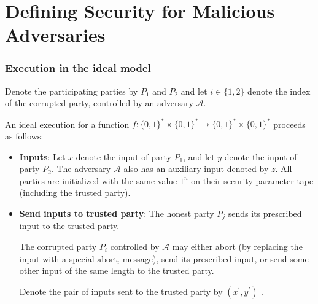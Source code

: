 \documentclass{beamer}
\begin{document}
    \section{Defining Security for Malicious Adversaries}
    \sectionpage 
    \begin{frame}
        \frametitle{Execution in the ideal model}
        \begin{definition}
            Denote the participating parties by $P_{1}$ and $P_{2}$ and let $i \in\{1,2\}$ denote the index of the corrupted party, controlled by an adversary $\mathcal{A} .$ 

            An ideal execution for a function $f:\{0,1\}^{*} \times\{0,1\}^{*} \rightarrow\{0,1\}^{*} \times\{0,1\}^{*}$ proceeds as follows:

            \begin{itemize}
                \item \textbf{Inputs}: Let $x$ denote the input of party $P_{1}$, and let $y$ denote the input of party $P_{2}$. The adversary $\mathcal{A}$ also has an auxiliary input denoted by $z .$ All parties are initialized with the same value $1^{n}$ on their security parameter tape (including the trusted party).
                \item \textbf{Send inputs to trusted party}: The honest party $P_{j}$ sends its prescribed input to the trusted party. 

                The corrupted party $P_{i}$ controlled by $\mathcal{A}$ may either abort (by replacing the input with a special $\mathrm{abort}_{i}$ message), send its prescribed input, or send some other input of the same length to the trusted party. 
                
                Denote the pair of inputs sent to the trusted party by $\left(x^{\prime}, y^{\prime}\right)$ .
            \end{itemize}

        \end{definition}
    
        
    
    \end{frame}
\end{document}
